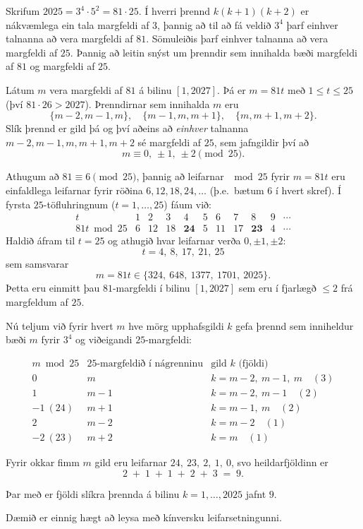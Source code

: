 
Skrifum $2025=3^4\cdot5^2=81\cdot25$.
Í hverri þrennd $k(k+1)(k+2)$ er nákvæmlega ein tala margfeldi af $3$,
þannig að til að fá veldið $3^4$ þarf einhver talnanna að vera margfeldi af $81$.
Sömuleiðis þarf einhver talnanna að vera margfeldi af $25$.
Þannig að leitin snýst um þrenndir sem innihalda bæði
margfeldi af $81$ og margfeldi af $25$.

Látum $m$ vera margfeldi af $81$ á bilinu $[1,2027]$.
Þá er $m=81t$ með $1\le t\le 25$ (því $81\cdot 26>2027$).
Þrenndirnar sem innihalda $m$ eru
\[
\{m-2,m-1,m\},\quad \{m-1,m,m+1\},\quad \{m,m+1,m+2\}.
\]
Slík þrennd er gild þá og því aðeins að \emph{einhver} talnanna
$m-2,m-1,m,m+1,m+2$ sé margfeldi af $25$, sem jafngildir því að
\[
m\equiv 0,\ \pm 1,\ \pm 2 \pmod{25}. \tag{$\star$}
\]

Athugum að $81\equiv 6 \pmod{25}$, þannig að leifarnar
\(\mod 25\) fyrir $m=81t$ eru einfaldlega leifarnar fyrir
röðina $6,12,18,24, \ldots$ (þ.e.\ bætum 6 í hvert skref).
Í fyrsta $25$-töfluhringnum ($t=1,\ldots,25$) fáum við:
\[
\begin{array}{c|cccccccccc}
t       & 1&2&3&4&5&6&7&8&9&\cdots\\
81t\bmod 25 & 6&12&18&\mathbf{24}&5&11&17&\mathbf{23}&4&\cdots
\end{array}
\]
Haldið áfram til $t=25$ og athugið hvar leifarnar verða $0,\pm1,\pm2$:
\[
\boxed{t=4,\ 8,\ 17,\ 21,\ 25}
\]
sem samsvarar
\[
m=81t\in\{324,\ 648,\ 1377,\ 1701,\ 2025\}.
\]
Þetta eru einmitt þau $81$-margfeldi í bilinu $[1,2027]$ sem eru
í fjarlægð $\le 2$ frá margfeldum af $25$.

\medskip
Nú teljum við fyrir hvert $m$ hve mörg upphafsgildi $k$ gefa þrennd sem inniheldur
bæði $m$ fyrir $3^4$ og viðeigandi $25$-margfeldi:

\[
\begin{array}{c|c|l}
m \bmod 25 & 25\text{-margfeldið í nágrenninu} & \text{gild }k \text{ (fjöldi)}\\
\hline
0          & m                                  & k=m-2,\ m-1,\ m \quad (3)\\
1          & m-1                                & k=m-2,\ m-1 \quad (2)\\
-1\ (24)   & m+1                                & k=m-1,\ m \quad (2)\\
2          & m-2                                & k=m-2 \quad (1)\\
-2\ (23)   & m+2                                & k=m \quad (1)
\end{array}
\]

Fyrir okkar fimm $m$ gild eru leifarnar $24,\ 23,\ 2,\ 1,\ 0$,
svo heildarfjöldinn er
\[
2\;+\;1\;+\;1\;+\;2\;+\;3 \;=\; 9.
\]

Þar með er fjöldi slíkra þrennda á bilinu $k=1,\ldots,2025$ jafnt $9$.

Dæmið er einnig hægt að leysa með kínversku leifarsetningunni.